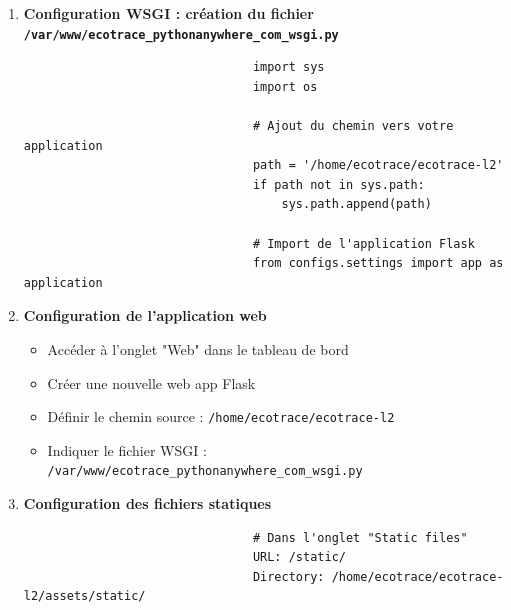 \documentclass[a4paper,11pt]{article}
\begin{document}
\begin{enumerate}
                    \item \textbf{Configuration WSGI : création du fichier \texttt{/var/www/ecotrace\_pythonanywhere\_com\_wsgi.py}}
                        \begin{tcolorbox}[colback=lightgray!6, colframe=black, left=-50mm, right=5mm, top=2mm, bottom=0mm, boxrule=0.1mm]
                            \begin{verbatim}
                                import sys
                                import os

                                # Ajout du chemin vers votre application
                                path = '/home/ecotrace/ecotrace-l2'
                                if path not in sys.path:
                                    sys.path.append(path)

                                # Import de l'application Flask
                                from configs.settings import app as application
                            \end{verbatim}
                        \end{tcolorbox}

                    \item \textbf{Configuration de l'application web}
                        \begin{itemize}
                            \item Accéder à l'onglet "Web" dans le tableau de bord
                            \item Créer une nouvelle web app Flask
                            \item Définir le chemin source : \texttt{/home/ecotrace/ecotrace-l2}
                            \item Indiquer le fichier WSGI : \texttt{/var/www/ecotrace\_pythonanywhere\_com\_wsgi.py}
                        \end{itemize}

                    \item \textbf{Configuration des fichiers statiques}
                        \begin{tcolorbox}[colback=lightgray!6, colframe=black, left=-50mm, right=5mm, top=2mm, bottom=0mm, boxrule=0.1mm]
                            \begin{verbatim}
                                # Dans l'onglet "Static files"
                                URL: /static/
                                Directory: /home/ecotrace/ecotrace-l2/assets/static/
                            \end{verbatim}
                        \end{tcolorbox}


\end{enumerate}
\end{document}
